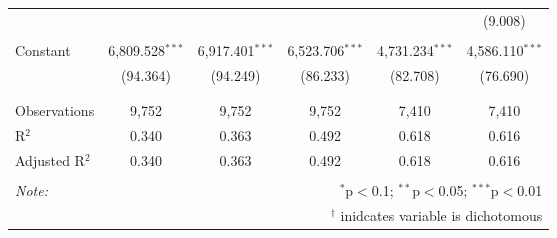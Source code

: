 \begin{table}[h]
\begin{tabular}{@{\extracolsep{5pt}}lccccc}
  &  &  &  &  & (9.008) \\ 
  & & & & & \\ 
 Constant & 6,809.528$^{***}$ & 6,917.401$^{***}$ & 6,523.706$^{***}$ & 4,731.234$^{***}$ & 4,586.110$^{***}$ \\ 
  & (94.364) & (94.249) & (86.233) & (82.708) & (76.690) \\ 
  & & & & & \\ 
\hline \\[-1.8ex] 
Observations & 9,752 & 9,752 & 9,752 & 7,410 & 7,410 \\ 
R$^{2}$ & 0.340 & 0.363 & 0.492 & 0.618 & 0.616 \\ 
Adjusted R$^{2}$ & 0.340 & 0.363 & 0.492 & 0.618 & 0.616 \\ 
\hline 
\hline \\[-1.8ex] 
\textit{Note:}  & \multicolumn{5}{r}{$^{*}$p$<$0.1; $^{**}$p$<$0.05; $^{***}$p$<$0.01} \\ 
 & \multicolumn{5}{r}{$^{\dag}$ inidcates variable is dichotomous} \\ 
\end{tabular} 
\end{table} 

